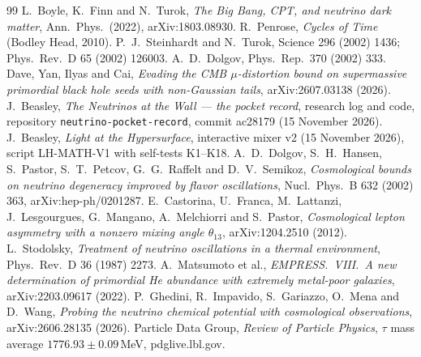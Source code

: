 \documentclass[11pt]{article}
\theoremstyle{definition}\newtheorem{hypothesis}{Hypothesis}\newtheorem{prediction}{Prediction}
\theoremstyle{remark}\newtheorem{remark}[theorem]{Remark}
\begin{document}
\begin{thebibliography}{99}
 L.~Boyle, K.~Finn and N.~Turok, \emph{The Big Bang, CPT, and neutrino dark matter}, Ann.\ Phys.\ (2022), arXiv:1803.08930.
 R.~Penrose, \emph{Cycles of Time} (Bodley Head, 2010).
 P.~J.~Steinhardt and N.~Turok, Science 296 (2002) 1436; Phys.\ Rev.\ D 65 (2002) 126003.
 A.~D.~Dolgov, Phys.\ Rep.\ 370 (2002) 333.
 Dave, Yan, Ilyas and Cai, \emph{Evading the CMB $\mu$-distortion bound on supermassive primordial black hole seeds with non-Gaussian tails}, arXiv:2607.03138 (2026).
 J.~Beasley, \emph{The Neutrinos at the Wall --- the pocket record}, research log and code, repository \texttt{neutrino-pocket-record}, commit ac28179 (15 November 2026).
 J.~Beasley, \emph{Light at the Hypersurface}, interactive mixer v2 (15 November 2026), script LH-MATH-V1 with self-tests K1--K18.
 A.~D.~Dolgov, S.~H.~Hansen, S.~Pastor, S.~T.~Petcov, G.~G.~Raffelt and D.~V.~Semikoz, \emph{Cosmological bounds on neutrino degeneracy improved by flavor oscillations}, Nucl.\ Phys.\ B 632 (2002) 363, arXiv:hep-ph/0201287.
 E.~Castorina, U.~Franca, M.~Lattanzi, J.~Lesgourgues, G.~Mangano, A.~Melchiorri and S.~Pastor, \emph{Cosmological lepton asymmetry with a nonzero mixing angle $\theta_{13}$}, arXiv:1204.2510 (2012).
 L.~Stodolsky, \emph{Treatment of neutrino oscillations in a thermal environment}, Phys.\ Rev.\ D 36 (1987) 2273.
 A.~Matsumoto et al., \emph{EMPRESS.\ VIII.\ A new determination of primordial He abundance with extremely metal-poor galaxies}, arXiv:2203.09617 (2022).
 P.~Ghedini, R.~Impavido, S.~Gariazzo, O.~Mena and D.~Wang, \emph{Probing the neutrino chemical potential with cosmological observations}, arXiv:2606.28135 (2026).
 Particle Data Group, \emph{Review of Particle Physics}, $\tau$ mass average $1776.93\pm0.09$\,MeV, pdglive.lbl.gov.
\end{thebibliography}
\end{document}
